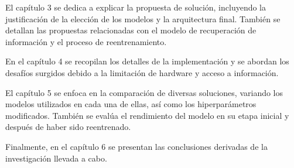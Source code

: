 El cap\'itulo 3 se dedica a explicar la propuesta de soluci\'on, incluyendo la justificaci\'on de la elecci\'on de los modelos y la arquitectura final. Tambi\'en se detallan las propuestas relacionadas con el modelo de recuperaci\'on de informaci\'on y el proceso de reentrenamiento.

En el cap\'itulo 4 se recopilan los detalles de la implementaci\'on y se abordan los desaf\'ios surgidos debido a la limitaci\'on de hardware y acceso a informaci\'on.

El cap\'itulo 5 se enfoca en la comparaci\'on de diversas soluciones, variando los modelos utilizados en cada una de ellas, as\'i como los hiperpar\'ametros modificados. Tambi\'en se evalúa el rendimiento del modelo en su etapa inicial y despu\'es de haber sido reentrenado.

Finalmente, en el cap\'itulo 6 se presentan las conclusiones derivadas de la investigaci\'on llevada a cabo.

